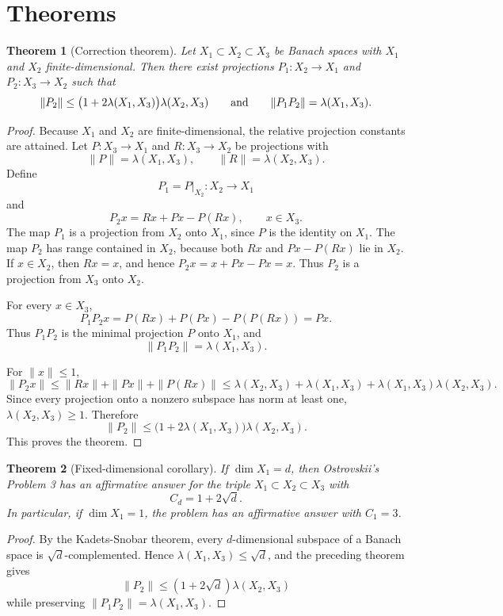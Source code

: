 \documentclass[11pt]{article}
\newtheorem{theorem}{Theorem}
\begin{document}
\section*{Theorems}

\begin{theorem}[Correction theorem]
Let $X_1\subset X_2\subset X_3$ be Banach spaces with $X_1$ and $X_2$
finite-dimensional.  Then there exist projections
$P_1:X_2\to X_1$ and $P_2:X_3\to X_2$ such that
\[
  \|P_2\|\leq \bigl(1+2\lambda(X_1,X_3)\bigr)\lambda(X_2,X_3)
  \qquad\hbox{and}\qquad
  \|P_1P_2\|=\lambda(X_1,X_3).
\]
\end{theorem}

\begin{proof}
Because $X_1$ and $X_2$ are finite-dimensional, the relative projection
constants are attained.  Let $P:X_3\to X_1$ and $R:X_3\to X_2$ be projections
with
\[
  \|P\|=\lambda(X_1,X_3),\qquad
  \|R\|=\lambda(X_2,X_3).
\]
Define
\[
  P_1=P|_{X_2}:X_2\to X_1
\]
and
\[
  P_2x=Rx+Px-P(Rx),\qquad x\in X_3.
\]
The map $P_1$ is a projection from $X_2$ onto $X_1$, since $P$ is the identity
on $X_1$.  The map $P_2$ has range contained in $X_2$, because both $Rx$ and
$Px-P(Rx)$ lie in $X_2$.  If $x\in X_2$, then $Rx=x$, and hence
$P_2x=x+Px-Px=x$.  Thus $P_2$ is a projection from $X_3$ onto $X_2$.

For every $x\in X_3$,
\[
  P_1P_2x
  =P(Rx)+P(Px)-P(P(Rx))
  =Px.
\]
Thus $P_1P_2$ is the minimal projection $P$ onto $X_1$, and
\[
  \|P_1P_2\|=\lambda(X_1,X_3).
\]

For $\|x\|\leq 1$,
\[
  \|P_2x\|
  \leq \|Rx\|+\|Px\|+\|P(Rx)\|
  \leq \lambda(X_2,X_3)+\lambda(X_1,X_3)
        +\lambda(X_1,X_3)\lambda(X_2,X_3).
\]
Since every projection onto a nonzero subspace has norm at least one,
$\lambda(X_2,X_3)\geq 1$.  Therefore
\[
  \|P_2\|
  \leq \bigl(1+2\lambda(X_1,X_3)\bigr)\lambda(X_2,X_3).
\]
This proves the theorem.
\end{proof}

\begin{theorem}[Fixed-dimensional corollary]
If $\dim X_1=d$, then Ostrovskii's Problem 3 has an affirmative answer for
the triple $X_1\subset X_2\subset X_3$ with
\[
  C_d=1+2\sqrt d.
\]
In particular, if $\dim X_1=1$, the problem has an affirmative answer with
$C_1=3$.
\end{theorem}

\begin{proof}
By the Kadets-Snobar theorem, every $d$-dimensional subspace of a Banach space
is $\sqrt d$-complemented.  Hence $\lambda(X_1,X_3)\leq\sqrt d$, and the
preceding theorem gives
\[
  \|P_2\|\leq (1+2\sqrt d)\lambda(X_2,X_3)
\]
while preserving $\|P_1P_2\|=\lambda(X_1,X_3)$.
\end{proof}
\end{document}
